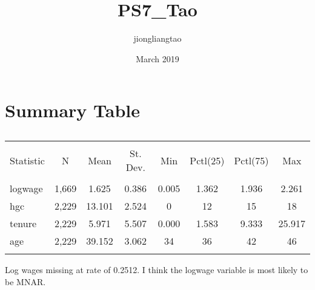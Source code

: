 \documentclass{article}
\title{PS7_Tao}
\author{jiongliangtao }
\date{March 2019}
\begin{document}
\maketitle

\section{Summary Table}
\begin{table}[!htbp] \centering 
  \caption{} 
  \label{} 
\begin{tabular}{@{\extracolsep{5pt}}lccccccc} 
\\[-1.8ex]\hline 
\hline \\[-1.8ex] 
Statistic & \multicolumn{1}{c}{N} & \multicolumn{1}{c}{Mean} & \multicolumn{1}{c}{St. Dev.} & \multicolumn{1}{c}{Min} & \multicolumn{1}{c}{Pctl(25)} & \multicolumn{1}{c}{Pctl(75)} & \multicolumn{1}{c}{Max} \\ 
\hline \\[-1.8ex] 
logwage & 1,669 & 1.625 & 0.386 & 0.005 & 1.362 & 1.936 & 2.261 \\ 
hgc & 2,229 & 13.101 & 2.524 & 0 & 12 & 15 & 18 \\ 
tenure & 2,229 & 5.971 & 5.507 & 0.000 & 1.583 & 9.333 & 25.917 \\ 
age & 2,229 & 39.152 & 3.062 & 34 & 36 & 42 & 46 \\ 
\hline \\[-1.8ex] 
\end{tabular} 
\end{table} 

Log wages missing at rate of 0.2512. I think the logwage variable is most likely to be MNAR. 
\end{document}
